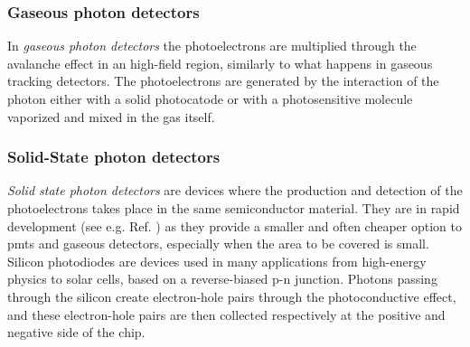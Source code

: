 \subsubsection*{Gaseous photon detectors}
In \textit{gaseous photon detectors} the photoelectrons are multiplied through the avalanche effect in an high-field region, similarly to what happens in gaseous tracking detectors. The photoelectrons are generated by the interaction of the photon either with a solid photocatode or with a photosensitive molecule vaporized and mixed in the gas itself. 

\subsubsection*{Solid-State photon detectors}
\textit{Solid state photon detectors} are devices where the production and detection of the photoelectrons takes place in the same semiconductor material. They are in rapid development (see e.g. Ref. \cite{Renker:2009zz}) as they provide a smaller and often cheaper option to \glspl{pmt} and gaseous detectors, especially when the area to be covered is small. Silicon photodiodes are devices used in many applications from high-energy physics to solar cells, based on a reverse-biased p-n junction. Photons passing through the silicon create electron-hole pairs through the photoconductive effect, and these electron-hole pairs are then collected respectively at the positive and negative side of the chip. 



